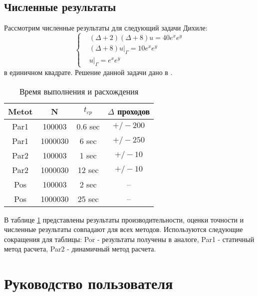 \section{Численные результаты}
Рассмотрим численные результаты для следующий задачи Дихиле:
\begin{equation} 
	\left\{
\begin{aligned}
& (\Delta + 2) (\Delta +8) u = 40e^{x}e^{y}\\ & (\Delta +8) u|_{\Gamma} = 10e^{x}e^{y}\\&u|_{\Gamma} = e^{x}e^{y}
\end{aligned}
 \right. \end{equation}
{}
в единичном квадрате. Решение данной задачи дано в \cite{luk:dis}.

\begin{table}[hp]
	\caption{Время выполнения и расхождения}
	\label{sample_table}
\begin{tabular}{|c|c|c|c|}
\hline 
Metot & N & $t_{cp}$ & $\Delta$ проходов \\ \hline
Par1 & 100003 & 0.6 sec & $+/- 200 $ \\ \hline
Par1 & 1000030 & 6 sec & $+/- 250 $ \\ \hline
Par2 & 100003 & 1 sec & $+/- 10 $ \\ \hline
Par2 & 1000030 & 12 sec & $+/- 10 $ \\ \hline
Pos & 100003 & 2 sec & -- \\ \hline
Pos & 1000030 & 25 sec & -- \\ \hline
\end{tabular}
\end{table}

В таблице \ref{sample_table} представлены результаты производительности, оценки точности и численные результаты совпадают для всех методов. Используются следующие сокращения для таблицы: Por - результаты получены в аналоге, Par1 - статичный метод расчета, Par2 - динамичный метод расчета.
\chapter{Руководство пользователя}
